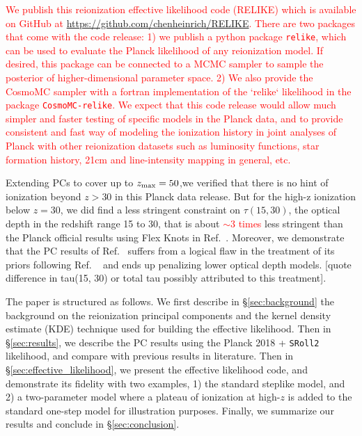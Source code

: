 \documentclass[prd,twocolumn,amsmath,amssymb,floatfix,superscriptaddress,nofootinbib]{revtex4-1}
\newcommand{\ch}[1]{\textcolor{red}{#1}}
\begin{document}
\ch{We publish this reionization effective likelihood code (RELIKE) which is available on GitHub at \url{https://github.com/chenheinrich/RELIKE}. There are two packages that come with the code release: 1) we publish a python package \texttt{relike}, which can be used to evaluate the Planck likelihood of any reionization model. If desired, this package can be connected to a MCMC sampler to sample the posterior of higher-dimensional parameter space. 2) We also provide the CosmoMC sampler with a fortran implementation of the `relike` likelihood in the package \texttt{CosmoMC-relike}. We expect that this code release would allow much simpler and faster testing of specific models in the Planck data, and to provide consistent and fast way of modeling the ionization history in joint analyses of Planck with other reionization datasets such as luminosity functions, star formation history, 21cm and line-intensity mapping in general, etc.
}

Extending PCs to cover up to $z_{\rm max} = 50$,we verified that there is no hint of ionization beyond $z>30$ in this Planck data release. But for the high-z ionization below $z=30$, we did find a less stringent constraint on $\tau(15, 30)$, the optical depth in the redshift range 15 to 30, that is about \ch{$\sim 3$ times} less stringent than the Planck official results using Flex Knots in Ref.~\cite{Aghanim:2018eyx}. Moreover, we demonstrate that the PC results of Ref.~\cite{Aghanim:2018eyx} suffers from a logical flaw in the treatment of its priors following Ref.
~\cite{Millea:2018bko} and ends up penalizing lower optical depth models. [quote difference in tau(15, 30) or total tau possibly attributed to this treatment]. %

The paper is structured as follows. We first describe in \S\ref{sec:background} the background on the reionization principal components and the kernel density estimate (KDE) technique used for building the effective likelihood. Then in \S\ref{sec:results}, we describe the PC results using the Planck 2018 + \texttt{SRoll2} likelihood, and compare with previous results in literature. Then in \S\ref{sec:effective_likelihood}, we present the effective likelihood code, and demonstrate its fidelity with two examples, 1) the standard steplike model, and 2) a two-parameter model where a plateau of ionization at high-$z$ is added to the standard one-step model for illustration purposes. Finally, we summarize our results and conclude in \S\ref{sec:conclusion}.
\end{document}
